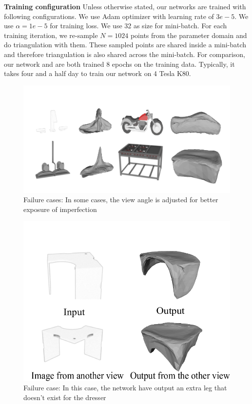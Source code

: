 \noindent \textbf{Training configuration}
Unless otherwise stated, our networks are trained with following configurations.
We use Adam optimizer\cite{adam} with learning rate of $3e-5$. We use $\alpha=1e-5$ for training loss.  
We use 32 as size for mini-batch. For each training iteration, we re-sample $N=1024$ points from the parameter domain and do triangulation with them. These sampled points are shared inside a mini-batch and therefore triangulation is also shared across the mini-batch.  For comparison, our network and \cite{PSGN} are both trained 8 epochs on the training data.
Typically, it takes four and a half day to train our network on 4 Tesla K80. 

\begin{figure}[htbp]
	\centering
	\includegraphics[width=\linewidth]{img/fail/fail1}
	\caption{Failure cases: In some cases, the view angle is adjusted for better exposure of imperfection}
	\label{fig:fail1}
\end{figure}
\begin{figure}[htbp]
	\centering
	\includegraphics[width=\linewidth]{img/fail/fail2}
	\caption{Failure case: In this case, the network have output an extra leg that doesn't exist for the dresser}
	\label{fig:fail2}
\end{figure}
